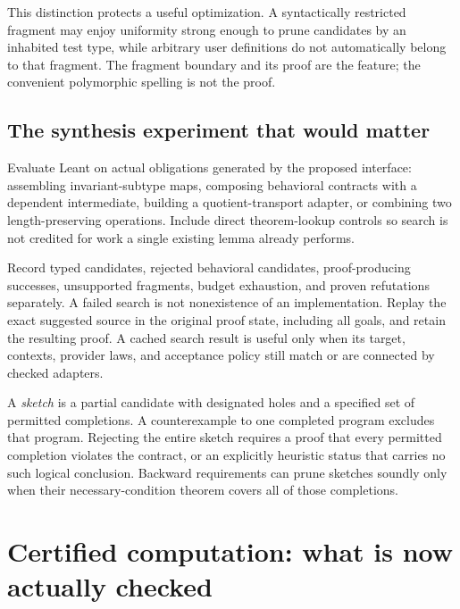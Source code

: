 \documentclass[11pt,letterpaper]{article}
\theoremstyle{definition}\newtheorem{definition}[proposition]{Definition}
\theoremstyle{remark}\newtheorem{remark}[proposition]{Remark}
\begin{document}
This distinction protects a useful optimization. A syntactically restricted
fragment may enjoy uniformity strong enough to prune candidates by an
inhabited test type, while arbitrary user definitions do not automatically
belong to that fragment. The fragment boundary and its proof are the feature;
the convenient polymorphic spelling is not the proof.

\subsection{The synthesis experiment that would matter}
Evaluate Leant on actual obligations generated by the proposed interface:
assembling invariant-subtype maps, composing behavioral contracts with a
dependent intermediate, building a quotient-transport adapter, or combining
two length-preserving operations. Include direct theorem-lookup controls so
search is not credited for work a single existing lemma already performs.

Record typed candidates, rejected behavioral candidates, proof-producing
successes, unsupported fragments, budget exhaustion, and proven refutations
separately. A failed search is not nonexistence of an implementation. Replay
the exact suggested source in the original proof state, including all goals,
and retain the resulting proof. A cached search result is useful only when
its target, contexts, provider laws, and acceptance policy still match or are
connected by checked adapters.

A \emph{sketch} is a partial candidate with designated holes and a specified
set of permitted completions. A counterexample to one completed program
excludes that program. Rejecting the entire sketch requires a proof that
every permitted completion violates the contract, or an explicitly heuristic
status that carries no such logical conclusion. Backward requirements can
prune sketches soundly only when their necessary-condition theorem covers
all of those completions.

\section{Certified computation: what is now actually checked}\label{sec:checker}
\end{document}
